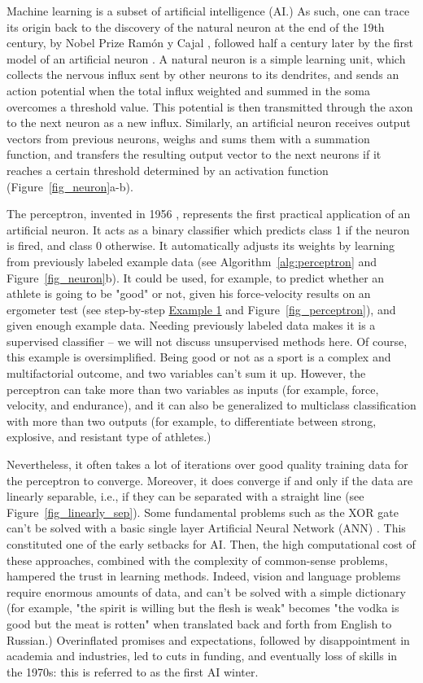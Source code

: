 Machine learning is a subset of artificial intelligence (AI.) As such, one can trace its origin back to the discovery of the natural neuron at the end of the 19th century, by Nobel Prize Ramón y Cajal \cite{Lopez2006}, followed half a century later by the first model of an artificial neuron \cite{Mcculloch1943}. A natural neuron is a simple learning unit, which collects the nervous influx sent by other neurons to its dendrites, and sends an action potential when the total influx weighted and summed in the soma overcomes a threshold value. This potential is then transmitted through the axon to the next neuron as a new influx. Similarly, an artificial neuron receives output vectors from previous neurons, weighs and sums them with a summation function, and transfers the resulting output vector to the next neurons if it reaches a certain threshold determined by an activation function (Figure~\ref{fig_neuron}a-b). 

The perceptron, invented in 1956 \cite{Rosenblatt1958}, represents the first practical application of an artificial neuron. It acts as a binary classifier which predicts class 1 if the neuron is fired, and class 0 otherwise. It automatically adjusts its weights by learning from previously labeled example data (see Algorithm~\ref{alg:perceptron} and Figure~\ref{fig_neuron}b). It could be used, for example, to predict whether an athlete is going to be "good" or not, given his force-velocity results on an ergometer test (see step-by-step \hyperlink{example1}{Example 1} and Figure~\ref{fig_perceptron}), and given enough example data. Needing previously labeled data makes it is a supervised classifier – we will not discuss unsupervised methods here. Of course, this example is oversimplified. Being good or not as a sport is a complex and multifactorial outcome, and two variables can't sum it up. However, the perceptron can take more than two variables as inputs (for example, force, velocity, and endurance), and it can also be generalized to multiclass classification with more than two outputs (for example, to differentiate between strong, explosive, and resistant type of athletes.)

Nevertheless, it often takes a lot of iterations over good quality training data for the perceptron to converge. Moreover, it does converge if and only if the data are linearly separable, i.e., if they can be separated with a straight line \cite{Novikoff1963} (see Figure~\ref{fig_linearly_sep}). Some fundamental problems such as the XOR gate can't be solved with a basic single layer Artificial Neural Network (ANN) \cite{Minsky1969}. This constituted one of the early setbacks for AI. Then, the high computational cost of these approaches, combined with the complexity of common-sense problems, hampered the trust in learning methods. Indeed, vision and language problems require enormous amounts of data, and can't be solved with a simple dictionary (for example, "the spirit is willing but the flesh is weak" becomes "the vodka is good but the meat is rotten" when translated back and forth from English to Russian.) Overinflated promises and expectations, followed by disappointment in academia and industries, led to cuts in funding, and eventually loss of skills in the 1970s: this is referred to as the first AI winter.

